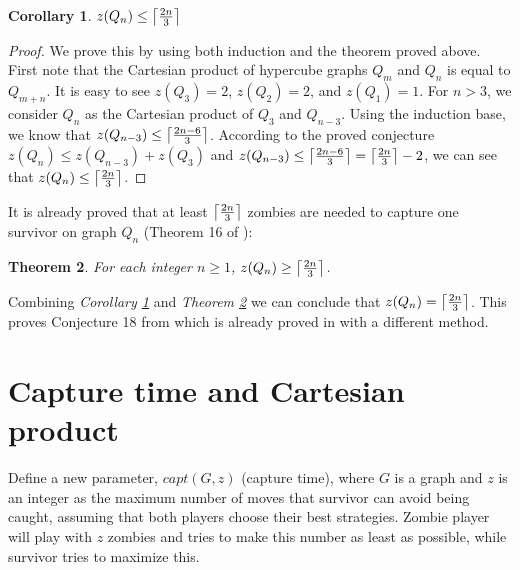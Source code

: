 \documentclass[1p]{elsarticle}
\DeclarePairedDelimiter\ceil{\lceil}{\rceil} \DeclarePairedDelimiter\floor{\lfloor}{\rfloor}
\newtheorem{theorem}{Theorem}
\newtheorem{corollary}[theorem]{Corollary}
\begin{document}
\begin{corollary}
	\label{C3}
	$z(Q_{n}) \leq \ceil*{\frac{2n}{3}}$
\end{corollary}
\begin{proof}
	We prove this by using both induction and the theorem proved above. First note that the Cartesian product of
	hypercube graphs $Q_{m}$ and $Q_{n}$ is equal to $Q_{m+n}$. It is easy to see $z(Q_3) = 2$, $z(Q_2) = 2$, and
	$z(Q_1) = 1$. For $n > 3$, we consider $Q_n$ as the Cartesian product of $Q_3$ and $Q_{n-3}$. Using the induction
	base, we know that $z(Q_{n-3}) \leq \ceil*{\frac{2n - 6}{3}}$. According to the proved conjecture $z(Q_n) \leq
	z(Q_{n-3}) + z(Q_3)$ and $z(Q_{n-3}) \leq \ceil*{\frac{2n - 6}{3}} = \ceil*{\frac{2n}{3}} - 2$, we can see that
	$z(Q_n) \leq \ceil*{\frac{2n}{3}}$.
\end{proof}

It is already proved that at least $\ceil*{\frac{2n}{3}}$ zombies are needed to capture one survivor on graph $Q_n$
(Theorem 16 of \cite{Fitz16}):

\begin{theorem}
	\label{T4}
	For each integer $n \geq 1$, $z(Q_n) \geq \ceil*{\frac{2n}{3}} $.
\end{theorem}

Combining {\it Corollary \ref{C3}} and {\it Theorem \ref{T4}} we can conclude that $z(Q_n) = \ceil*{\frac{2n}{3}}$.
This proves Conjecture 18 from \cite{Fitz16} which is already proved in \cite{Offner19} with a different method. 
	

\section{Capture time and Cartesian product}\label{capturetime}
	Define a new parameter, $capt(G,z)$ (capture time), where $G$ is a graph and $z$ is an integer as the maximum number
	of moves that survivor can avoid being caught, assuming that both players choose their best strategies. Zombie
	player will play with $z$ zombies and tries to make this number as least as possible, while survivor tries to
	maximize this.
\end{document}
